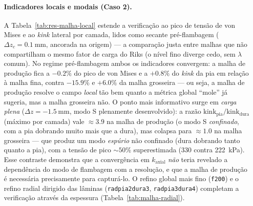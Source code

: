 \paragraph{Indicadores locais e modais (Caso 2).} A Tabela~\ref{tab:res-malha-local} estende a verificação ao pico de tensão de von Mises e ao \emph{kink} lateral por camada, lidos como secante pré-flambagem ($\Delta z_c = \SI{0.1}{\milli\meter}$, ancorada na origem) --- a comparação justa entre malhas que não compartilham o mesmo fator de carga do Riks (o nível fino diverge cedo, sem $\lambda$ comum). No regime pré-flambagem ambos os indicadores convergem: a malha de produção fica a $-0.2\%$ do pico de von Mises e a $+0.8\%$ do \emph{kink} da pia em relação à malha fina, contra $-15.9\%$ e $+6.0\%$ da malha grosseira --- ou seja, a malha de produção resolve o campo \emph{local} tão bem quanto a métrica global ``mole'' já sugeria, mas a malha grosseira não. O ponto mais informativo surge em \emph{carga plena} ($\Delta z = -\SI{1.5}{\milli\meter}$, modo S plenamente desenvolvido): a razão $\mathrm{kink}_{\mathrm{pia}}/\mathrm{kink}_{\mathrm{dura}}$ (máximo por camada) vale $\approx 3.9$ na malha de produção (o modo S \emph{confinado}, com a pia dobrando muito mais que a dura), mas colapsa para $\approx 1.0$ na malha grosseira --- que produz um modo \emph{espúrio} não confinado (dura dobrando tanto quanto a pia), com a tensão de pico $\sim 50\%$ superestimada (\SI{330}{} contra \SI{222}{\kilo\pascal}). Esse contraste demonstra que a convergência em $k_{\mathrm{axial}}$ \emph{não} teria revelado a dependência do modo de flambagem com a resolução, e que a malha de produção é necessária precisamente para capturá-lo. O refino global mais fino (\texttt{f200}) e o refino radial dirigido das lâminas (\texttt{radpia2dura3}, \texttt{radpia3dura4}) completam a verificação através da espessura (Tabela~\ref{tab:malha-radial}).

